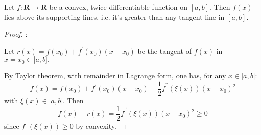 \documentclass[12pt]{article}
\begin{document}
Let $f:\mathbf{R}\rightarrow \mathbf{R}$ be a convex, twice differentiable
function on $[a,b]$. Then $f(x)$ lies above its supporting lines, i.e. it's
greater than any tangent line in $[a,b]$.

\begin{proof}:

Let $r(x)=f\left( x_{0}\right) +f^{\prime }\left( x_{0}\right) \left(
x-x_{0}\right) $ be the tangent of $f(x)$ in $x=x_{0}\in \lbrack a,b].$

By Taylor theorem, with remainder in Lagrange form, one has, for any $x\in
\lbrack a,b]$:
\[
f\left( x\right) =f\left( x_{0}\right) +f^{\prime }\left( x_{0}\right)
\left( x-x_{0}\right) +\frac{1}{2}f^{^{\prime \prime }}\left( \xi \left(
x\right) \right) \left( x-x_{0}\right) ^{2}
\]
with $\xi \left( x\right) \in \lbrack a,b]$. Then
\[
f\left( x\right) -r(x)=\frac{1}{2}f^{^{\prime \prime }}\left( \xi \left(
x\right) \right) \left( x-x_{0}\right) ^{2}\geq 0
\]
since $f^{^{\prime \prime }}\left( \xi \left( x\right) \right) \geq 0$ by
convexity.
\end{proof}
\end{document}
